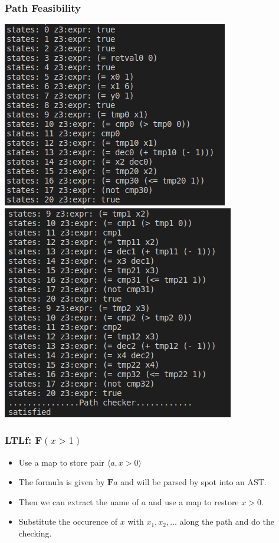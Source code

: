 \documentclass[11pt]{beamer}
\begin{document}
\begin{frame}\frametitle{Path Feasibility}
\begin{center}
\includegraphics[scale=0.4]{p4.png}
\includegraphics[scale=0.4]{p5.png}
\end{center}
\end{frame}


\begin{frame}\frametitle{LTLf: $\mathbf{F}(x > 1)$}

\begin{itemize}
\item Use a map to store pair $\langle a, x > 0\rangle$
\item 
The formula is given by $\mathbf{F}a$ and will be parsed by spot into an AST.
\item Then we can extract the name of $a$ and use a map to restore $x > 0$.
\item Substitute the occurence of $x$ with $x_1, x_2, \ldots$ along the path and do the checking.
\end{itemize}

\end{frame}
\end{document}

